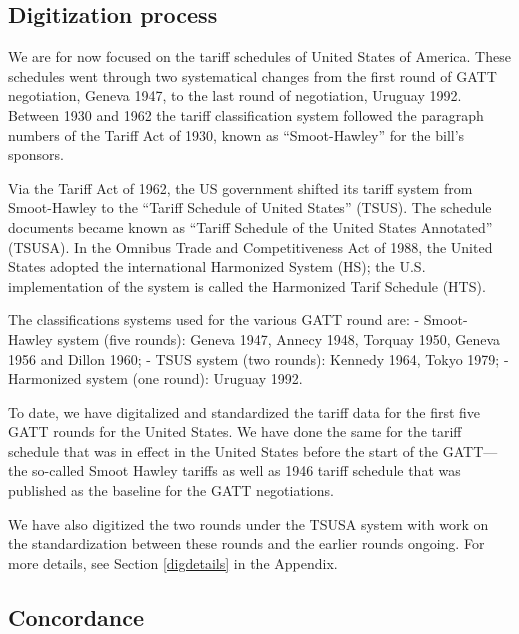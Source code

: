 \documentclass[
  12pt,
]{article}
\begin{document}
\hypertarget{digitization-process}{%
\subsection{Digitization process}\label{digitization-process}}

We are for now focused on the tariff schedules of United States of America. These schedules went through two systematical changes from the first round of GATT negotiation, Geneva 1947, to the last round of negotiation, Uruguay 1992. Between 1930 and 1962 the tariff classification system followed the paragraph numbers of the Tariff Act of 1930, known as ``Smoot-Hawley'' for the bill's sponsors.

Via the Tariff Act of 1962, the US government shifted its tariff system from Smoot-Hawley to the ``Tariff Schedule of United States'' (TSUS). The schedule documents became known as ``Tariff Schedule of the United States Annotated'' (TSUSA). In the Omnibus Trade and Competitiveness Act of 1988, the United States adopted the international Harmonized System (HS); the U.S. implementation of the system is called the Harmonized Tarif Schedule (HTS).

The classifications systems used for the various GATT round are:
- Smoot-Hawley system (five rounds): Geneva 1947, Annecy 1948, Torquay 1950, Geneva 1956 and Dillon 1960;
- TSUS system (two rounds): Kennedy 1964, Tokyo 1979;
- Harmonized system (one round): Uruguay 1992.

To date, we have digitalized and standardized the tariff data for the first five GATT rounds for the United States. We have done the same for the tariff schedule that was in effect in the United States before the start of the GATT---the so-called Smoot Hawley tariffs as well as 1946 tariff schedule that was published as the baseline for the GATT negotiations.

We have also digitized the two rounds under the TSUSA system with work on the standardization between these rounds and the earlier rounds ongoing. For more details, see Section \ref{digdetails} in the Appendix.

\hypertarget{concordance}{%
\subsection{Concordance}\label{concordance}}
\end{document}
